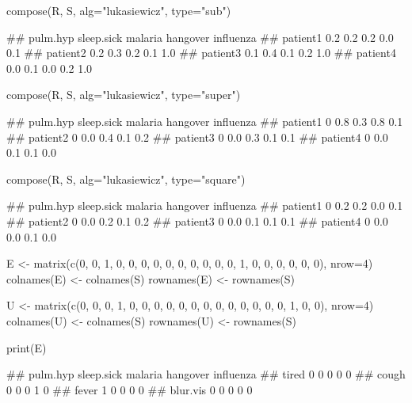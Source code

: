 \documentclass{article}\usepackage[]{graphicx}\usepackage[]{color}
\begin{document}
\begin{Schunk}
% --begin: "comp.subsupsquare"
\begin{Sinput}
compose(R, S, alg="lukasiewicz", type="sub")
\end{Sinput}
\begin{Soutput}
##          pulm.hyp sleep.sick malaria hangover influenza
## patient1      0.2        0.2     0.2      0.0       0.1
## patient2      0.2        0.3     0.2      0.1       1.0
## patient3      0.1        0.4     0.1      0.2       1.0
## patient4      0.0        0.1     0.0      0.2       1.0
\end{Soutput}
\begin{Sinput}
compose(R, S, alg="lukasiewicz", type="super")
\end{Sinput}
\begin{Soutput}
##          pulm.hyp sleep.sick malaria hangover influenza
## patient1        0        0.8     0.3      0.8       0.1
## patient2        0        0.0     0.4      0.1       0.2
## patient3        0        0.0     0.3      0.1       0.1
## patient4        0        0.0     0.1      0.1       0.0
\end{Soutput}
\begin{Sinput}
compose(R, S, alg="lukasiewicz", type="square")
\end{Sinput}
\begin{Soutput}
##          pulm.hyp sleep.sick malaria hangover influenza
## patient1        0        0.2     0.2      0.0       0.1
## patient2        0        0.0     0.2      0.1       0.2
## patient3        0        0.0     0.1      0.1       0.1
## patient4        0        0.0     0.0      0.1       0.0
\end{Soutput}
%
% --end: "comp.subsupsquare"
\end{Schunk}

\begin{Schunk}
\begin{Sinput}
E <- matrix(c(0, 0, 1, 0,
              0, 0, 0, 0,
              0, 0, 0, 0,
              0, 1, 0, 0,
              0, 0, 0, 0), nrow=4)
colnames(E) <- colnames(S)
rownames(E) <- rownames(S)

U <- matrix(c(0, 0, 0, 1,
              0, 0, 0, 0,
              0, 0, 0, 0,
              0, 0, 0, 0,
              0, 1, 0, 0), nrow=4)
colnames(U) <- colnames(S)
rownames(U) <- rownames(S)
\end{Sinput}
\end{Schunk}

\begin{Schunk}
% --begin: "comp.e"
\begin{Sinput}
print(E)
\end{Sinput}
\begin{Soutput}
##          pulm.hyp sleep.sick malaria hangover influenza
## tired           0          0       0        0         0
## cough           0          0       0        1         0
## fever           1          0       0        0         0
## blur.vis        0          0       0        0         0
\end{Soutput}
%
% --end: "comp.e"
\end{Schunk}
\end{document}
